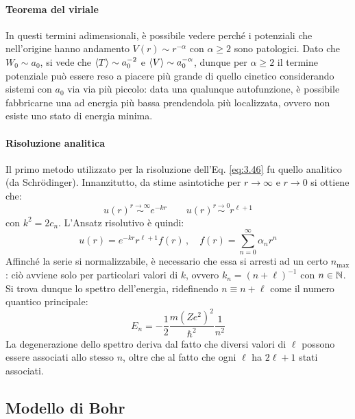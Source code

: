 \paragraph{Teorema del viriale}

In questi termini adimensionali, è possibile vedere perché i potenziali che nell'origine hanno andamento $ V(r) \sim r^{-\alpha} $ con $ \alpha \ge 2 $ sono patologici. Dato che $ W_0 \sim a_0 $, si vede che $ \braket{T} \sim a_0^{-2} $ e $ \braket{V} \sim a_0^{-\alpha} $, dunque per $ \alpha \ge 2 $ il termine potenziale può essere reso a piacere più grande di quello cinetico considerando sistemi con $ a_0 $ via via più piccolo: data una qualunque autofunzione, è possibile fabbricarne una ad energia più bassa prendendola più localizzata, ovvero non esiste uno stato di energia minima.

\paragraph{Risoluzione analitica}

Il primo metodo utilizzato per la risoluzione dell'Eq. \ref{eq:3.46} fu quello analitico (da Schrödinger). Innanzitutto, da stime asintotiche per $ r \rightarrow \infty $ e $ r \rightarrow 0 $ si ottiene che:
\begin{equation*}
	u(r) \overset{r \rightarrow \infty}{\sim} e^{-kr} \qquad u(r) \overset{r \rightarrow 0}{\sim} r^{\ell + 1}
\end{equation*}
con $ k^2 = 2c_n $.
L'Ansatz risolutivo è quindi:
\begin{equation*}
	u(r) = e^{-kr} r^{\ell + 1} f(r) \,, \quad f(r) = \sum_{n = 0}^{\infty} \alpha_n r^n
\end{equation*}
Affinché la serie si normalizzabile, è necessario che essa si arresti ad un certo $ n_{\text{max}} $: ciò avviene solo per particolari valori di $ k $, ovvero $ k_n = (n + \ell)^{-1} $ con $ n \in \mathbb{N} $. Si trova dunque lo spettro dell'energia, ridefinendo $ n \equiv n + \ell $ come il numero quantico principale:
\begin{equation}
	E_n = -\frac{1}{2} \frac{m(Ze^2)^2}{\hbar^2} \frac{1}{n^2}
	\label{eq:3.47}
\end{equation}
La degenerazione dello spettro deriva dal fatto che diversi valori di $ \ell $ possono essere associati allo stesso $ n $, oltre che al fatto che ogni $ \ell $ ha $ 2\ell + 1 $ stati associati.

\subsection{Modello di Bohr}
\label{bohr-hydrogen}

